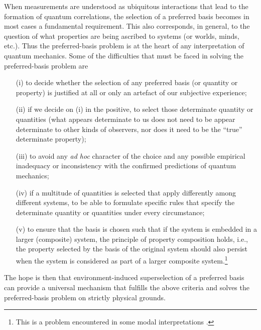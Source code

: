 \documentclass[twocolumn,rmp,aps,amsmath,amsfonts,noshowkeys,noshowpacs]{revtex4}
\begin{document}
When measurements are understood as ubiquitous interactions that lead
to the formation of quantum correlations, the selection of a preferred
basis becomes in most cases a fundamental requirement.  This also
corresponds, in general, to the question of what properties are being
ascribed to systems (or worlds, minds, etc.).  Thus the
preferred-basis problem is at the heart of any interpretation of
quantum mechanics. Some of the difficulties that must be faced in
solving the preferred-basis problem are 

\begin{enumerate}

\item[(i)] to decide whether the
selection of any preferred basis (or quantity or property) is
justified at all or only an artefact of our subjective experience;

\item[(ii)] if we decide on (i) in the positive, to select those determinate
quantity or quantities (what appears determinate to us does not
need to be appear determinate to other kinds of observers, nor does it
need to be the ``true'' determinate property); 

\item[(iii)] to avoid any \emph{ad hoc} character of the choice and
  any possible empirical inadequacy or inconsistency with the
  confirmed predictions of quantum mechanics;
  
\item[(iv)] if a multitude of quantities is selected that apply
  differently among different systems, to be able to formulate
  specific rules that specify the determinate quantity or quantities
  under every circumstance;
  
\item[(v)] to ensure that the basis is chosen such that if the system
  is embedded in a larger (composite) system, the principle of
  property composition holds, i.e., the property selected by the basis
  of the original system should also persist when the system is
  considered as part of a larger composite system.\footnote{This is a
    problem encountered in some modal interpretations
    \citep[see][]{Clifton:1996:op}.}

\end{enumerate}
  
The hope is then that environment-induced superselection of a
preferred basis can provide a universal mechanism that fulfills the
above criteria and solves the preferred-basis problem on strictly
physical grounds.
\end{document}
